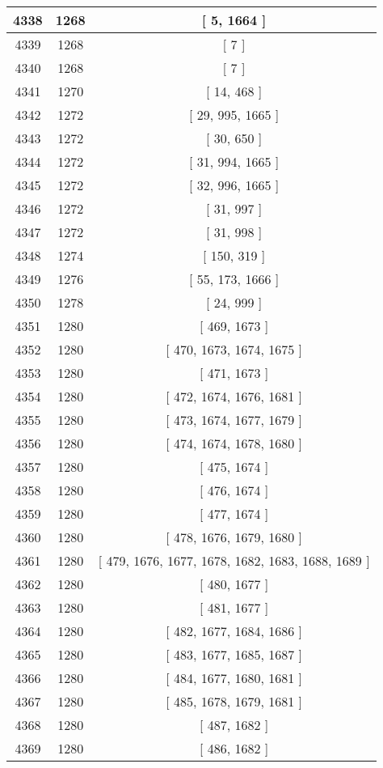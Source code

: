 \begin{center}
\begin{longtable}[H]{|| c c c ||}
\hline
4338 & 1268 & [ 5, 1664 ] \\ 
\hline
4339 & 1268 & [ 7 ] \\ 
\hline
4340 & 1268 & [ 7 ] \\ 
\hline
4341 & 1270 & [ 14, 468 ] \\ 
\hline
4342 & 1272 & [ 29, 995, 1665 ] \\ 
\hline
4343 & 1272 & [ 30, 650 ] \\ 
\hline
4344 & 1272 & [ 31, 994, 1665 ] \\ 
\hline
4345 & 1272 & [ 32, 996, 1665 ] \\ 
\hline
4346 & 1272 & [ 31, 997 ] \\ 
\hline
4347 & 1272 & [ 31, 998 ] \\ 
\hline
4348 & 1274 & [ 150, 319 ] \\ 
\hline
4349 & 1276 & [ 55, 173, 1666 ] \\ 
\hline
4350 & 1278 & [ 24, 999 ] \\ 
\hline
4351 & 1280 & [ 469, 1673 ] \\ 
\hline
4352 & 1280 & [ 470, 1673, 1674, 1675 ] \\ 
\hline
4353 & 1280 & [ 471, 1673 ] \\ 
\hline
4354 & 1280 & [ 472, 1674, 1676, 1681 ] \\ 
\hline
4355 & 1280 & [ 473, 1674, 1677, 1679 ] \\ 
\hline
4356 & 1280 & [ 474, 1674, 1678, 1680 ] \\ 
\hline
4357 & 1280 & [ 475, 1674 ] \\ 
\hline
4358 & 1280 & [ 476, 1674 ] \\ 
\hline
4359 & 1280 & [ 477, 1674 ] \\ 
\hline
4360 & 1280 & [ 478, 1676, 1679, 1680 ] \\ 
\hline
4361 & 1280 & [ 479, 1676, 1677, 1678, 1682, 1683, 1688, 1689 ] \\ 
\hline
4362 & 1280 & [ 480, 1677 ] \\ 
\hline
4363 & 1280 & [ 481, 1677 ] \\ 
\hline
4364 & 1280 & [ 482, 1677, 1684, 1686 ] \\ 
\hline
4365 & 1280 & [ 483, 1677, 1685, 1687 ] \\ 
\hline
4366 & 1280 & [ 484, 1677, 1680, 1681 ] \\ 
\hline
4367 & 1280 & [ 485, 1678, 1679, 1681 ] \\ 
\hline
4368 & 1280 & [ 487, 1682 ] \\ 
\hline
4369 & 1280 & [ 486, 1682 ] \\ 

\end{longtable}
\end{center}
